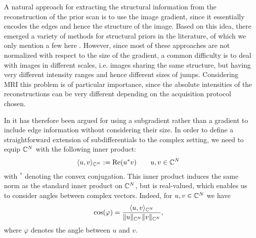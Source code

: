 A natural approach for extracting the structural information from the reconstruction of the prior scan is to use the image gradient, since it essentially encodes the edges and hence the structure of the image. Based on this idea, there emerged a variety of methods for structural priors in the literature, of which we only mention a few here \cite{kaipio1999,Ehrhardt2015,Ehrhardt2016,Bowsher:Bayesian,Chan:Regularized, Nuyts:Mutual,Atre:Evaluation, Leahy1991, Lipinski:Expectation, Vunckx:Evaluation}.  
However, since most of these approaches are not normalized with respect to the size of the gradient, a common difficulty is to deal with images in different scales, i.e. images sharing the same structure, but having very different intensity ranges and hence different sizes of jumps. 
Considering MRI this problem is of particular importance, since the absolute intensities of the reconstructions can be very different depending on the acquisition protocol chosen.

In \cite{Rasch2017} it has therefore been argued for using a subgradient rather than a gradient to include edge information without considering their size. 
In order to define a straightforward extension of subdifferentials to the complex setting, we need to equip $\mathbb{C}^N$ with the following inner product:
\begin{align*}
\langle u,v \rangle_{\mathbb{C}^N} := \mathrm{Re} (u^* v) \qquad u,v \in \mathbb{C}^N 
\end{align*}
with $^*$ denoting the convex conjugation. 
This inner product induces the same norm as the standard inner product on $\mathbb{C}^N$, but is real-valued, which enables us to consider angles between complex vectors. 
Indeed, for $u,v \in \mathbb{C}^N$ we have 
\begin{align*}
	\cos(\varphi) = \frac{\langle u, v \rangle_{\mathbb{C}^N}}{\|u\|_{\mathbb{C}^N} \|v\|_{\mathbb{C}^N}}, 
\end{align*}
where $\varphi$ denotes the angle between $u$ and $v$. 

